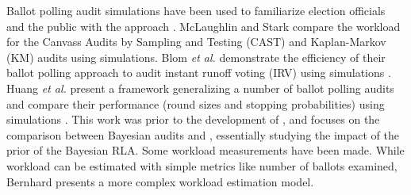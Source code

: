 Ballot polling audit simulations have been used to familiarize election officials and the public with the approach \cite{dice}. McLaughlin and Stark \cite{mclaughlin_thesis,simulations_house} compare the workload for the Canvass Audits by Sampling and Testing (CAST) and Kaplan-Markov (KM) audits using simulations. Blom {\em et al.} demonstrate the efficiency of their ballot polling approach to audit instant runoff voting (IRV) using simulations \cite{blom_IRV}. Huang {\em et al.} present a framework generalizing a number of ballot polling audits and compare their performance (round sizes and stopping probabilities) using simulations \cite{DBLP:conf/evoteid/HuangRSTV20}. This work was prior to the development of \Minerva, and focuses on the comparison between Bayesian audits \cite{bayesian-audits} and \BRAVO, essentially studying the impact of the prior of the Bayesian RLA. Some workload measurements have been made\cite{RI-report}. While workload can be estimated with simple metrics like number of ballots examined\cite{bernoulli-ballot-polling}, Bernhard presents a more complex workload estimation model\cite{bernhard-diss}. 

